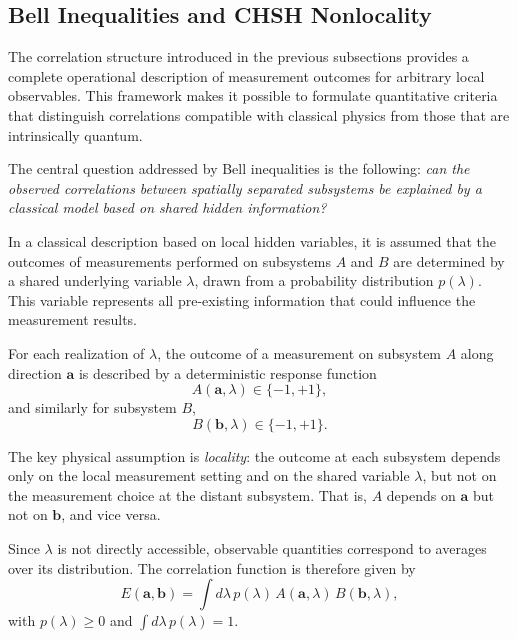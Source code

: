 \documentclass[a4paper]{article}
\begin{document}

\subsection{Bell Inequalities and CHSH Nonlocality}

The correlation structure introduced in the previous subsections provides a complete operational description of measurement outcomes for arbitrary local observables. This framework makes it possible to formulate quantitative criteria that distinguish correlations compatible with classical physics from those that are intrinsically quantum.

\medskip

The central question addressed by Bell inequalities is the following: \emph{can the observed correlations between spatially separated subsystems be explained by a classical model based on shared hidden information?}

\medskip

In a classical description based on local hidden variables, it is assumed that the outcomes of measurements performed on subsystems \( A \) and \( B \) are determined by a shared underlying variable \( \lambda \), drawn from a probability distribution \( p(\lambda) \). This variable represents all pre-existing information that could influence the measurement results.

\medskip

For each realization of \( \lambda \), the outcome of a measurement on subsystem \( A \) along direction \( \mathbf{a} \) is described by a deterministic response function
\[
A(\mathbf{a},\lambda) \in \{-1, +1\},
\]
and similarly for subsystem \( B \),
\[
B(\mathbf{b},\lambda) \in \{-1, +1\}.
\]

\medskip

The key physical assumption is \emph{locality}: the outcome at each subsystem depends only on the local measurement setting and on the shared variable \( \lambda \), but not on the measurement choice at the distant subsystem. That is, \( A \) depends on \( \mathbf{a} \) but not on \( \mathbf{b} \), and vice versa.

\medskip

Since \( \lambda \) is not directly accessible, observable quantities correspond to averages over its distribution. The correlation function is therefore given by
\[
E(\mathbf{a},\mathbf{b})
=
\int d\lambda\, p(\lambda)\,
A(\mathbf{a},\lambda)\, B(\mathbf{b},\lambda),
\]
with \( p(\lambda) \ge 0 \) and \( \int d\lambda\, p(\lambda) = 1 \).
\end{document}
